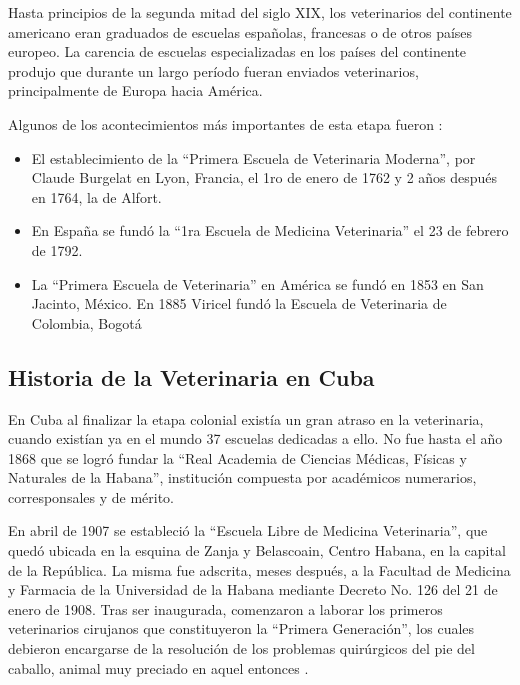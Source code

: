 Hasta principios de la segunda mitad del siglo XIX, los veterinarios del continente americano eran graduados de escuelas españolas, francesas o de otros países europeo. La carencia de escuelas especializadas en los países del continente produjo que durante un largo período fueran enviados veterinarios, principalmente de Europa hacia América.  

Algunos de los acontecimientos más importantes de esta etapa fueron : 
\begin{itemize}
 \item El establecimiento de la “Primera Escuela de Veterinaria Moderna”, por Claude Burgelat en Lyon, Francia, el 1ro de enero de 1762 y 2 años después en 1764, la de Alfort.  
 \item En España se fundó la “1ra Escuela de Medicina Veterinaria” el 23 de febrero de 1792.  
 \item  La “Primera Escuela de Veterinaria” en América se fundó en 1853 en San Jacinto, México. En 1885 Viricel fundó la Escuela de Veterinaria de Colombia, Bogotá  
\end{itemize}
\newpage


\subsection{Historia de la Veterinaria en Cuba }

En Cuba al finalizar la etapa colonial existía un gran atraso en la veterinaria, cuando existían ya en el mundo 37 escuelas dedicadas a ello. No fue hasta el año 1868 que se logró fundar la “Real Academia de Ciencias Médicas, Físicas y Naturales de la Habana”, institución compuesta por académicos numerarios, corresponsales y de mérito.  

En abril de 1907 se estableció la “Escuela Libre de Medicina Veterinaria”, que quedó ubicada en la esquina de Zanja y Belascoain, Centro Habana, en la capital de la República. La misma fue adscrita, meses después, a la Facultad de Medicina y Farmacia de la Universidad de la Habana mediante Decreto No. 126 del 21 de enero de 1908. Tras ser inaugurada, comenzaron a laborar los primeros veterinarios cirujanos que constituyeron la “Primera Generación”, los cuales debieron encargarse de la resolución de los problemas quirúrgicos del pie del caballo, animal muy preciado en aquel entonces .  

